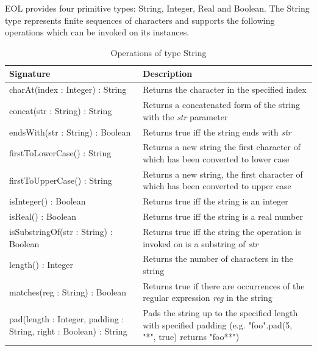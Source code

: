 EOL provides four primitive types: String, Integer, Real and Boolean. The String type represents finite sequences of characters and supports the following operations which can be invoked on its instances.
\clearpage
\begin{longtabu} {|p{6.5cm}|X|}
\caption{Operations of type String}
\label{tab:StringOperations}\\
\hline 
    \textbf{Signature} & \textbf{Description} \\\hline
    charAt(index : Integer) : String & Returns the character in the specified index\\\hline
    
    concat(str : String) : String & Returns a concatenated form of the string with the \emph{str} parameter\\\hline
    
    endsWith(str : String) : Boolean & Returns true iff the string ends with \emph{str}\\\hline
    
    firstToLowerCase() : String & Returns a new string the first character of which has been converted to lower case \\\hline
    
    firstToUpperCase() : String & Returns a new string, the first character of which has been converted to upper case \\\hline
    
    isInteger() : Boolean & Returns true iff the string is an integer\\\hline
    
    isReal() : Boolean & Returns true iff the string is a real number\\\hline
    
    isSubstringOf(str : String) : Boolean & Returns true iff the string the operation is invoked on is a substring of \emph{str} \\\hline
    
    length() : Integer & Returns the number of characters in the string \\\hline
    
    matches(reg : String) : Boolean & Returns true if there are occurrences of the regular expression \emph{reg} in the string\\\hline
    
    pad(length : Integer, padding : String, right : Boolean) : String & Pads the string up to the specified length with specified padding (e.g. "foo".pad(5, "*", true) returns "foo**") \\\hline
    

\end{longtabu}
